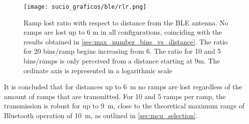 \begin{figure}[ht]
	\centering
	\texttt{[image: sucio\_graficos/ble/rlr.png]}
	\caption{Ramp lost ratio with respect to distance from the BLE antenna. No ramps are lost up to 6 m in all configurations, coinciding with the results obtained in \cref{sec:max_number_bins_vs_distance}. The ratio for 20 bins/ramp begins increasing from 6. The ratio for 10 and 5 bins/ramps is only perceived from a distance starting at 9m. The ordinate axis is represented in a logarithmic scale}
	\label{fig:firmware_ble_char_rlr}
\end{figure}

It is concluded that for distances up to \SI{6}{\metre} no ramps are lost regardless of the amount of ramps that are transmitted. For 10 and 5 ramps per ramp, the transmission is robust for up to \SI{9}{\metre}, close to the theoretical maximum range of Bluetooth operation of \SI{10}{\metre}, as outlined in \cref{sec:mcu_selection}.




